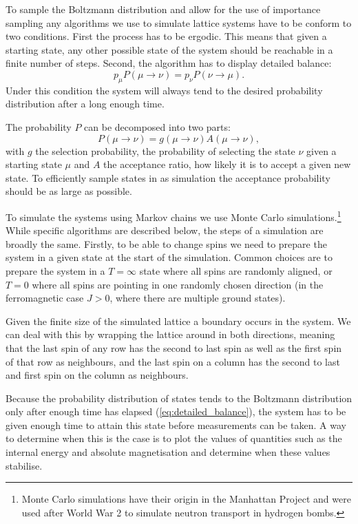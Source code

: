 \documentclass[11pt, a4paper]{report} %
\begin{document}
To sample the Boltzmann distribution and allow for the use of importance sampling any algorithms we use to simulate lattice systems have to be conform to two conditions.
First the process has to be ergodic.
This means that given a starting state, any other possible state of the system should be reachable in a finite number of steps.
Second, the algorithm has to display detailed balance:
\begin{equation}\label{eq:detailed_balance}
	p_{\mu} P(\mu \to \nu) = p_{\nu} P(\nu \to \mu).
\end{equation}
Under this condition the system will always tend to the desired probability distribution after a long enough time.

The probability \(P\) can be decomposed into two parts:
\begin{equation}
	P(\mu\to\nu) = g(\mu\to\nu) A(\mu\to \nu),
\end{equation}
with \(g\) the selection probability, the probability of selecting the state \(\nu\) given a starting state \(\mu\) and \(A\) the acceptance ratio, how likely it is to accept a given new state.
To efficiently sample states in as simulation the acceptance probability should be as large as possible.

To simulate the systems using Markov chains we use Monte Carlo simulations.\footnote{Monte Carlo simulations have their origin in the Manhattan Project and were used after World War 2 to simulate neutron transport in hydrogen bombs.\cite{newman:1999}}
While specific algorithms are described below, the steps of a simulation are broadly the same.
Firstly, to be able to change spins we need to prepare the system in a given state at the start of the simulation.
Common choices are to prepare the system in a \(T=\infty\) state where all spins are randomly aligned, or \(T=0\) where all spins are pointing in one randomly chosen direction (in the ferromagnetic case \(J>0\), where there are multiple ground states).\cite{newman:1999}

Given the finite size of the simulated lattice a boundary occurs in the system.
We can deal with this by wrapping the lattice around in both directions, meaning that the last spin of any row has the second to last spin as well as the first spin of that row as neighbours, and the last spin on a column has the second to last and first spin on the column as neighbours.\cite{landau:2015}

Because the probability distribution of states tends to the Boltzmann distribution only after enough time has elapsed (\cref{eq:detailed_balance}), the system has to be given enough time to attain this state before measurements can be taken.
A way to determine when this is the case is to plot the values of quantities such as the internal energy and absolute magnetisation and determine when these values stabilise.
\end{document}
